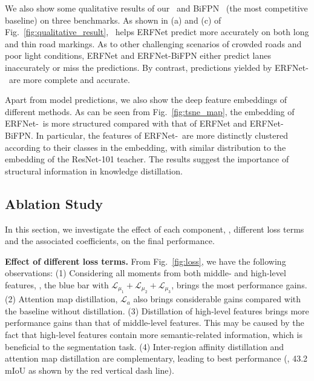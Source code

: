 \documentclass[10pt,twocolumn,letterpaper]{article}
\begin{document}
We also show some qualitative results of our \algorithmname~and BiFPN~\cite{zhu2018bidirectional} (the most competitive baseline) on three benchmarks. As shown in (a) and (c) of Fig.~\ref{fig:qualitative_result}, \algorithmname~helps ERFNet predict more accurately on both long and thin road markings. As to other challenging scenarios of crowded roads and poor light conditions, ERFNet and ERFNet-BiFPN either predict lanes inaccurately or miss the predictions. By contrast, predictions yielded by ERFNet-\algorithmname~are more complete and accurate.

Apart from model predictions, we also show the deep feature embeddings of different methods. As can be seen from Fig.~\ref{fig:tsne_map}, the embedding of ERFNet-\algorithmname~is more structured compared with that of ERFNet and ERFNet-BiFPN.
In particular, the features of ERFNet-\algorithmname~are more distinctly clustered according to their classes in the embedding, with similar distribution to the embedding of the ResNet-101 teacher.
The results suggest the importance of structural information in knowledge distillation.



\subsection{Ablation Study}

In this section, we investigate the effect of each component, \ie, different loss terms and the associated coefficients, on the final performance.


\noindent \textbf{Effect of different loss terms.} From Fig.~\ref{fig:loss}, we have the following observations: (1) Considering all moments from both middle- and high-level features, \ie, the blue bar with $\mathcal{L}_{\mu_1}+\mathcal{L}_{\mu_2}+\mathcal{L}_{\mu_3}$, brings the most performance gains. (2) Attention map distillation, $\mathcal{L}_{a}$ also brings considerable gains compared with the baseline without distillation. (3) Distillation of high-level features brings more performance gains than that of middle-level features. This may be caused by the fact that high-level features contain more semantic-related information, which is beneficial to the segmentation task. (4) Inter-region affinity distillation and attention map distillation are complementary, leading to best performance (\ie, 43.2 mIoU as shown by the red vertical dash line).
\end{document}
